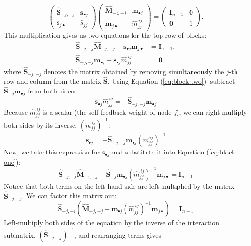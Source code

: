 \[
\begin{pmatrix} \widehat{\mathbf{S}}_{-j,-j} & \mathbf{s}_{\bullet j} \\ \mathbf{s}_{j \bullet} & \widehat{s}_{jj} \end{pmatrix} \begin{pmatrix} \widehat{\mathbf{M}}_{-j,-j} & \mathbf{m}_{\bullet j} \\ \mathbf{m}_{j \bullet} & \widehat{m}_{jj}^{\,ij} \end{pmatrix} = \begin{pmatrix} \mathbf{I}_{n-1} & \mathbf{0} \\ \mathbf{0}^\top & 1 \end{pmatrix}.
\]
This multiplication gives us two equations for the top row of blocks:
\begin{align}
\widehat{\mathbf{S}}_{-j,-j} \widehat{\mathbf{M}}_{-j,-j} + \mathbf{s}_{\bullet j} \mathbf{m}_{j \bullet} & = \mathbf{I}_{n-1}, \label{eq:block-one}\\
\widehat{\mathbf{S}}_{-j,-j}\mathbf{m}_{\bullet j} + \mathbf{s}_{\bullet j} \widehat{m}_{jj}^{\,ij} & = \mathbf{0}, \label{eq:block-two}
\end{align}
where $\widehat{\mathbf{S}}_{-j,-j}$ denotes the matrix obtained by removing simultaneously the $j$-th row and column from the matrix $\widehat{\mathbf{S}}$. Using Equation (\ref{eq:block-two}), subtract $\widehat{\mathbf{S}}_{-j} \mathbf{m}_{\bullet j}$ from both sides:
\[
\mathbf{s}_{\bullet j} \widehat{m}_{jj}^{\,ij} = - \widehat{\mathbf{S}}_{-j,-j} \mathbf{m}_{\bullet j}
\]
Because $\widehat{m}_{jj}^{\,ij}$ is a scalar (the self-feedback weight of node $j$), we can right-multiply both sides by its inverse, $(\widehat{m}_{jj}^{\,ij})^{-1}$:
\[
\mathbf{s}_{\bullet j} = - \widehat{\mathbf{S}}_{-j,-j} \mathbf{m}_{\bullet j} (\widehat{m}_{jj}^{\,ij})^{-1}
\]
Now, we take this expression for $\mathbf{s}_{\bullet j}$ and substitute it into Equation (\ref{eq:block-one}):
\[
\widehat{\mathbf{S}}_{-j,-j} \widehat{\mathbf{M}}_{-j,-j} - \widehat{\mathbf{S}}_{-j} \mathbf{m}_{\bullet j} (\widehat{m}_{jj}^{\,ij})^{-1} \mathbf{m}_{j \bullet} = \mathbf{I}_{n-1}
\]
Notice that both terms on the left-hand side are left-multiplied by the matrix $\widehat{\mathbf{S}}_{-j,-j}$. We can factor this matrix out:
\[
\widehat{\mathbf{S}}_{-j,-j} \left( \widehat{\mathbf{M}}_{-j,-j} - \mathbf{m}_{\bullet j} (\widehat{m}_{jj}^{\,ij})^{-1} \mathbf{m}_{j \bullet} \right) = \mathbf{I}_{n-1}
\]
Left-multiply both sides of the equation by the inverse of the interaction submatrix, $(\widehat{\mathbf{S}}_{-j,-j})^{-1}$, and rearranging terms gives:
